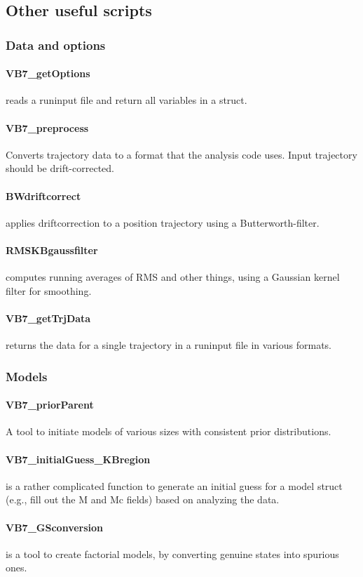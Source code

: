 \subsection{Other useful scripts}
\subsubsection{Data and options}
\paragraph{VB7\_getOptions} 
reads a runinput file and return all variables in a struct.
\paragraph{VB7\_preprocess} 
Converts trajectory data to a format that the analysis code
uses. Input trajectory should be drift-corrected.
\paragraph{BWdriftcorrect}
applies driftcorrection to a position trajectory using a Butterworth-filter.
\paragraph{RMSKBgaussfilter}
computes running averages of RMS and other things, using a Gaussian
kernel filter for smoothing.
\paragraph{VB7\_getTrjData} 
returns the data for a single trajectory in a runinput file in various
formats.

\subsubsection{Models}
\paragraph{VB7\_priorParent} 
A tool to initiate models of various sizes with consistent prior
distributions.
\paragraph{VB7\_initialGuess\_KBregion} 
is a rather complicated function to generate an initial guess for a
model struct (e.g., fill out the M and Mc fields) based on analyzing
the data.
\paragraph{VB7\_GSconversion}
is a tool to create factorial models, by converting genuine states
into spurious ones.
